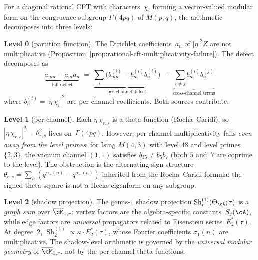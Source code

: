\begin{proposition}%
\label{prop:shadow-arithmetic-trichotomy}%
\ClaimStatusProvedHere%
%
%
For a diagonal rational CFT with characters~$\chi_i$ forming a
vector-valued modular form on the congruence subgroup
$\Gamma(4pq)$ of $M(p,q)$, the arithmetic decomposes into three
levels\textup{:}

\textup{\textbf{Level 0}} \textup{(}partition function\textup{)}.
The Dirichlet coefficients~$a_n$ of $|\eta|^2 Z$ are not
multiplicative
\textup{(}Proposition~\textup{\ref{prop:rational-cft-multiplicativity-failure}}\textup{)}.
The defect decomposes as
\[
 \underbrace{a_{mn} - a_m a_n}_{\text{full defect}}
 \;=\;
 \underbrace{\textstyle\sum_i \bigl(b_{mn}^{(i)} - b_m^{(i)}b_n^{(i)}\bigr)}_{\text{per-channel defect}}
 \;-\;
 \underbrace{\textstyle\sum_{i \neq j} b_m^{(i)}b_n^{(j)}}_{\text{cross-channel terms}}
\]
where $b_n^{(i)} = |\eta\,\chi_i|^2$ are per-channel
coefficients. Both sources contribute.

\textup{\textbf{Level 1}} \textup{(}per-channel\textup{)}.
Each $\eta\,\chi_{r,s}$ is a theta function
\textup{(}Rocha--Caridi\textup{)}, so
$|\eta\,\chi_{r,s}|^2 = \theta_{r,s}^2$
lives on~$\Gamma(4pq)$.
However, per-channel multiplicativity fails \emph{even away from
the level primes}:
for Ising $M(4,3)$ with level $48$ and level primes $\{2,3\}$,
the vacuum channel $(1,1)$ satisfies
$b_{35} \neq b_5 b_7$ (both $5$ and~$7$ are coprime to the level).
The obstruction is the alternating-sign structure
$\theta_{r,s} = \sum_n(q^{\alpha_+(n)} - q^{\alpha_-(n)})$
inherited from the Rocha--Caridi formula:
the signed theta square is not a Hecke eigenform on any subgroup.

\textup{\textbf{Level 2}} \textup{(}shadow projection\textup{)}.
The genus-$1$ shadow projection
$\operatorname{Sh}_r^{(1)}(\Theta_\cA;\tau)$
is a \emph{graph sum} over $\overline{\cM}_{1,r}$:
vertex factors are the algebra-specific
constants~$S_j(\cA)$, while edge factors are
\emph{universal} propagators related to
Eisenstein series~$E_2^*(\tau)$.
At degree~$2$, $\operatorname{Sh}_2^{(1)} \propto
\kappa \cdot E_2^*(\tau)$, whose Fourier coefficients
$\sigma_1(n)$ are multiplicative.
The shadow-level arithmetic is governed by the
\emph{universal modular geometry} of $\overline{\cM}_{1,r}$,
not by the per-channel theta functions.
\end{proposition}


